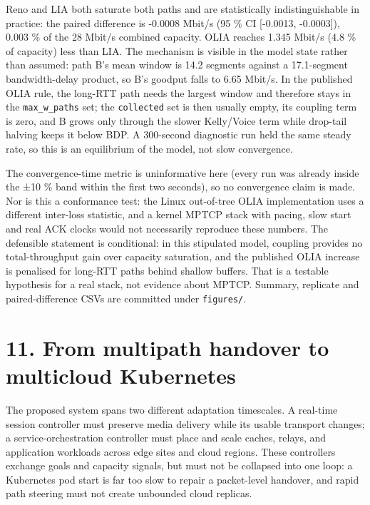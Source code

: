 \documentclass[
  american,
  11pt,
]{article}
\begin{document}
Reno and LIA both saturate both paths and are statistically
indistinguishable in practice: the paired difference is -0.0008 Mbit/s
(95 \% CI {[}-0.0013, -0.0003{]}), 0.003 \% of the 28 Mbit/s combined
capacity. OLIA reaches 1.345 Mbit/s (4.8 \% of capacity) less than LIA.
The mechanism is visible in the model state rather than assumed: path
B's mean window is 14.2 segments against a 17.1-segment bandwidth-delay
product, so B's goodput falls to 6.65 Mbit/s. In the published OLIA
rule, the long-RTT path needs the largest window and therefore stays in
the \texttt{max\_w\_paths} set; the \texttt{collected} set is then
usually empty, its coupling term is zero, and B grows only through the
slower Kelly/Voice term while drop-tail halving keeps it below BDP. A
300-second diagnostic run held the same steady rate, so this is an
equilibrium of the model, not slow convergence.

The convergence-time metric is uninformative here (every run was already
inside the ±10 \% band within the first two seconds), so no convergence
claim is made. Nor is this a conformance test: the Linux out-of-tree
OLIA implementation uses a different inter-loss statistic, and a kernel
MPTCP stack with pacing, slow start and real ACK clocks would not
necessarily reproduce these numbers. The defensible statement is
conditional: in this stipulated model, coupling provides no
total-throughput gain over capacity saturation, and the published OLIA
increase is penalised for long-RTT paths behind shallow buffers. That is
a testable hypothesis for a real stack, not evidence about MPTCP.
Summary, replicate and paired-difference CSVs are committed under
\texttt{figures/}.

\section{11. From multipath handover to multicloud
Kubernetes}\label{from-multipath-handover-to-multicloud-kubernetes}

The proposed system spans two different adaptation timescales. A
real-time session controller must preserve media delivery while its
usable transport changes; a service-orchestration controller must place
and scale caches, relays, and application workloads across edge sites
and cloud regions. These controllers exchange goals and capacity
signals, but must not be collapsed into one loop: a Kubernetes pod start
is far too slow to repair a packet-level handover, and rapid path
steering must not create unbounded cloud replicas.
\end{document}
